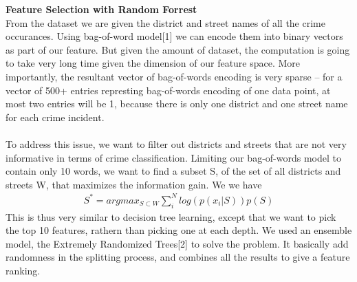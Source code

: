 \documentclass[12pt]{article}
\newenvironment{p3}[2][Methods]{\begin{trivlist}
\item[\hskip \labelsep {\bfseries #1}\hskip \labelsep {\bfseries #2}]}{\end{trivlist}}
\begin{document}
\begin{p3}{}
\item{\textbf{Feature Selection with Random Forrest\\}}
From the dataset we are given the district and street names of all the crime occurances. Using bag-of-word model[1] we can encode them into binary vectors as part of our feature. But given the amount of dataset, the computation is going to take very long time given the dimension of our feature space. More importantly, the resultant vector of bag-of-words encoding is very sparse -- for a vector of 500+ entries represting bag-of-words encoding of one data point, at most two entries will be 1, because there is only one district and one street name for each crime incident.\\\\
To address this issue, we want to filter out districts and streets that are not very informative in terms of crime classification. Limiting our bag-of-words model to contain only 10 words, we want to find a subset S, of the set of all districts and streets W, that maximizes the information gain. We we have
\begin{align*}
	S^* = argmax_{S \subset W} \sum_i^N log(p(x_i|S)) p(S)
\end{align*}
This is thus very similar to decision tree learning, except that we want to pick the top 10 features, rathern than picking one at each depth. We used an ensemble model, the Extremely Randomized Trees[2] to solve the problem. It basically add randomness in the splitting process, and combines all the results to give a feature ranking.
\end{p3}
\end{document}
